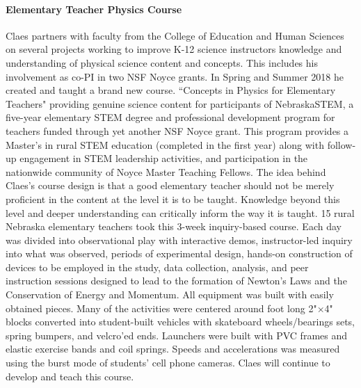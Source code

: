 \paragraph{Elementary Teacher Physics Course}
Claes partners with faculty from the College of Education and Human Sciences on several projects working to improve K-12 science instructors knowledge and understanding of physical science content and concepts.  This includes his involvement as co-PI in two NSF Noyce grants. In Spring and Summer 2018 he created and taught a brand new course. ``Concepts in Physics for Elementary Teachers" providing genuine science content for participants of NebraskaSTEM, a five-year elementary STEM degree and professional development program for teachers funded through yet another NSF Noyce grant. This program provides a Master’s in rural STEM education (completed in the first year) along with follow-up engagement in STEM leadership activities, and participation in the nationwide community of Noyce Master Teaching Fellows. 
The idea behind Claes's course design is that a good elementary teacher should not be merely proficient in the content at the level it is to be taught. Knowledge beyond this level and deeper understanding can critically inform the way it is taught.
15 rural Nebraska elementary teachers took this 3-week inquiry-based course. Each day was divided into observational play with interactive demos, instructor-led inquiry into what was observed, periods of experimental design, hands-on construction of devices to be employed in the study, data collection, analysis, and peer instruction sessions designed to lead to the formation of Newton’s Laws and the Conservation of Energy and Momentum. All equipment was built with easily obtained pieces. Many of the activities were centered around foot long 2"$\times$4" blocks converted into student-built vehicles with skateboard wheels/bearings sets, spring bumpers, and velcro’ed ends. Launchers were built with PVC frames and elastic exercise bands and coil springs.  Speeds and accelerations was measured using the burst mode of students' cell phone cameras.  Claes will continue to develop and teach this course.

